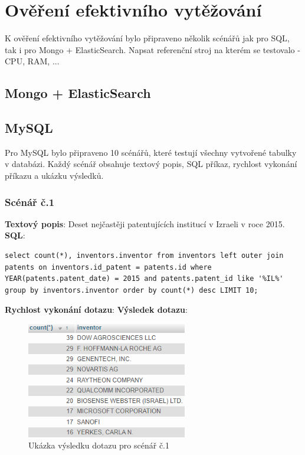 \lstset{style=sqlstyle}

\chapter{Ověření efektivního vytěžování}
K ověření efektivního vytěžování bylo připraveno několik scénářů jak pro SQL, tak i pro Mongo + ElasticSearch.\newline
Napsat referenční stroj na kterém se testovalo - CPU, RAM, ...
\section{Mongo + ElasticSearch}
\section{MySQL}
Pro MySQL bylo připraveno 10 scénářů, které testují všechny vytvořené tabulky v databázi. Každý scénář obsahuje textový popis, SQL příkaz, rychlost vykonání příkazu a ukázku výsledků.

\subsection{Scénář č.1}
\textbf{Textový popis}: Deset nejčastěji patentujících institucí v Izraeli v roce 2015.
\newline
\textbf{SQL}: 
\begin{lstlisting}[label = {lst:elements_a}]
select count(*), inventors.inventor from inventors left outer join patents on inventors.id_patent = patents.id where YEAR(patents.patent_date) = 2015 and patents.patent_id like '%IL%' group by inventors.inventor order by count(*) desc LIMIT 10;
\end{lstlisting}
\textbf{Rychlost vykonání dotazu}: 
\newline
\textbf{Výsledek dotazu}:
\begin{figure}[H]
\centering
\includegraphics[width=7cm]{img/scenare/scenar_1}
\caption{Ukázka výsledku dotazu pro scénář č.1}
\label{fig:scenar1}
\end{figure}


